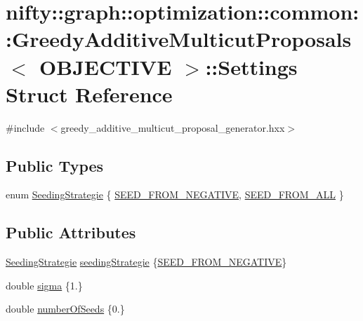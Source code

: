\hypertarget{structnifty_1_1graph_1_1optimization_1_1common_1_1GreedyAdditiveMulticutProposals_1_1Settings}{}\section{nifty\+:\+:graph\+:\+:optimization\+:\+:common\+:\+:Greedy\+Additive\+Multicut\+Proposals$<$ O\+B\+J\+E\+C\+T\+I\+V\+E $>$\+:\+:Settings Struct Reference}
\label{structnifty_1_1graph_1_1optimization_1_1common_1_1GreedyAdditiveMulticutProposals_1_1Settings}


{\ttfamily \#include $<$greedy\+\_\+additive\+\_\+multicut\+\_\+proposal\+\_\+generator.\+hxx$>$}

\subsection*{Public Types}
\begin{DoxyCompactItemize}
\item 
enum \hyperlink{structnifty_1_1graph_1_1optimization_1_1common_1_1GreedyAdditiveMulticutProposals_1_1Settings_af521b54eb40400d1d2f209ea599308af}{Seeding\+Strategie} \{ \hyperlink{structnifty_1_1graph_1_1optimization_1_1common_1_1GreedyAdditiveMulticutProposals_1_1Settings_af521b54eb40400d1d2f209ea599308afa30da62082821c7f8b904ec6985065085}{S\+E\+E\+D\+\_\+\+F\+R\+O\+M\+\_\+\+N\+E\+G\+A\+T\+I\+V\+E}, 
\hyperlink{structnifty_1_1graph_1_1optimization_1_1common_1_1GreedyAdditiveMulticutProposals_1_1Settings_af521b54eb40400d1d2f209ea599308afa47b196e5396f46ed6ca77e097e260748}{S\+E\+E\+D\+\_\+\+F\+R\+O\+M\+\_\+\+A\+L\+L}
 \}
\end{DoxyCompactItemize}
\subsection*{Public Attributes}
\begin{DoxyCompactItemize}
\item 
\hyperlink{structnifty_1_1graph_1_1optimization_1_1common_1_1GreedyAdditiveMulticutProposals_1_1Settings_af521b54eb40400d1d2f209ea599308af}{Seeding\+Strategie} \hyperlink{structnifty_1_1graph_1_1optimization_1_1common_1_1GreedyAdditiveMulticutProposals_1_1Settings_a6dca32463236ea17fbdc418c8676c93c}{seeding\+Strategie} \{\hyperlink{structnifty_1_1graph_1_1optimization_1_1common_1_1GreedyAdditiveMulticutProposals_1_1Settings_af521b54eb40400d1d2f209ea599308afa30da62082821c7f8b904ec6985065085}{S\+E\+E\+D\+\_\+\+F\+R\+O\+M\+\_\+\+N\+E\+G\+A\+T\+I\+V\+E}\}
\item 
double \hyperlink{structnifty_1_1graph_1_1optimization_1_1common_1_1GreedyAdditiveMulticutProposals_1_1Settings_ad115048107a1951b86c80951262ff20a}{sigma} \{1.\}
\item 
double \hyperlink{structnifty_1_1graph_1_1optimization_1_1common_1_1GreedyAdditiveMulticutProposals_1_1Settings_ad862a463a3b266049c613cc729159bd0}{number\+Of\+Seeds} \{0.\}
\end{DoxyCompactItemize}


